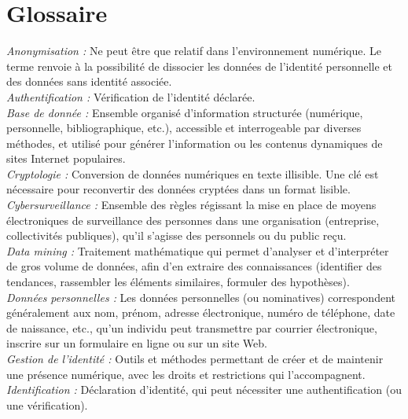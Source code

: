 \documentclass[a4paper,12pt]{article}
\begin{document}
\section*{Glossaire}

\emph{Anonymisation :} Ne peut être que relatif dans l’environnement numérique. Le terme renvoie à la possibilité de dissocier les données de l’identité personnelle et des données sans identité associée. \\


\emph{Authentification :} Vérification de l’identité déclarée.\\


\emph{Base de donnée :} Ensemble organisé d’information structurée (numérique, personnelle, bibliographique, etc.), accessible et interrogeable par diverses méthodes, et utilisé pour générer l’information ou les contenus dynamiques de sites Internet populaires.\\

\emph{Cryptologie :} Conversion de données numériques en texte illisible. Une clé est nécessaire pour reconvertir des données cryptées dans un format lisible.\\


\emph{Cybersurveillance :} Ensemble des règles régissant la mise en place de moyens électroniques de surveillance des personnes dans une organisation (entreprise, collectivités publiques), qu’il s’agisse des personnels ou du public reçu. \\


\emph{Data mining :} Traitement mathématique qui permet d’analyser et d’interpréter de gros volume de données, afin d’en extraire des connaissances (identifier des tendances, rassembler les éléments similaires, formuler des hypothèses). \\


\emph{Données personnelles :} Les données personnelles (ou nominatives) correspondent généralement aux nom, prénom, adresse électronique, numéro de téléphone, date de naissance, etc., qu’un individu peut transmettre par courrier électronique, inscrire sur un formulaire en ligne ou sur un site Web.\\


\emph{Gestion de l’identité :} Outils et méthodes permettant de créer et de maintenir une présence numérique, avec les droits et restrictions qui l’accompagnent. \\


\emph{Identification :} Déclaration d’identité, qui peut nécessiter une authentification (ou une vérification). \\
\end{document}
